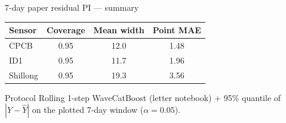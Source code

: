\begin{frame}{7-day paper residual PI --- summary}
  {\footnotesize
  \centering
  \begin{tabular}{lccc}
    \toprule
    Sensor & Coverage & Mean width & Point MAE \\
    \midrule
    CPCB     & 0.95 & 12.0 & 1.48 \\
    ID1      & 0.95 & 11.7 & 1.96 \\
    Shillong & 0.95 & 19.3 & 3.56 \\
    \bottomrule
  \end{tabular}
  }
  \vspace{0.7em}
  \begin{exampleblock}{Protocol}
    Rolling 1-step WaveCatBoost (letter notebook) + 95\% quantile of
    $|Y-\widehat Y|$ on the plotted 7-day window ($\alpha=0.05$).
  \end{exampleblock}
\end{frame}
